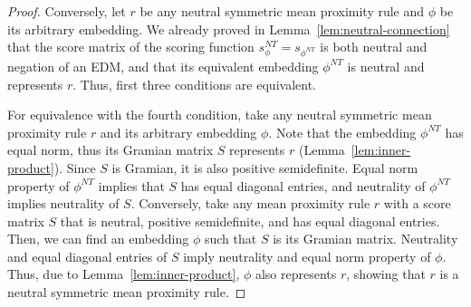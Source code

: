 \documentclass[10pt,letterpaper]{article}
\newcommand{\calL}{{\mathcal{L}}}
\newcommand{\rank}{{\calL(A)}}
\newcommand{\nt}{NT}
\begin{document}
\begin{proof}
Conversely, let $r$ be any neutral symmetric mean proximity rule and $\phi$ be its arbitrary embedding. We already proved in Lemma~\ref{lem:neutral-connection} that the score matrix of the scoring function $s_{\phi}^{\nt} = s_{\phi^{\nt}}$ is both neutral and negation of an EDM, and that its equivalent embedding $\phi^{\nt}$ is neutral and represents $r$. Thus, first three conditions are equivalent. 

For equivalence with the fourth condition, take any neutral symmetric mean proximity rule $r$ and its arbitrary embedding $\phi$. Note that the embedding $\phi^{\nt}$ has equal norm, thus its Gramian matrix $S$ represents $r$ (Lemma~\ref{lem:inner-product}). Since $S$ is Gramian, it is also positive semidefinite. Equal norm property of $\phi^{\nt}$ implies that $S$ has equal diagonal entries, and neutrality of $\phi^{\nt}$ implies neutrality of $S$. Conversely, take any mean proximity rule $r$ with a score matrix $S$ that is neutral, positive semidefinite, and has equal diagonal entries. Then, we can find an embedding $\phi$ such that $S$ is its Gramian matrix. Neutrality and equal diagonal entries of $S$ imply neutrality and equal norm property of $\phi$. Thus, due to Lemma~\ref{lem:inner-product}, $\phi$ also represents $r$, showing that $r$ is a neutral symmetric mean proximity rule. 
\end{proof}
\end{document}

